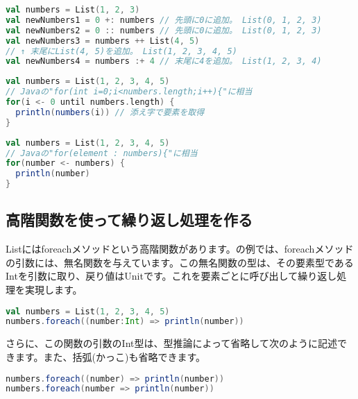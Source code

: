 \begin{lstlisting}[language=scala, label=src:add_elements, caption=要素を追加する例]
val numbers = List(1, 2, 3)
val newNumbers1 = 0 +: numbers // 先頭に0に追加。 List(0, 1, 2, 3)
val newNumbers2 = 0 :: numbers // 先頭に0に追加。 List(0, 1, 2, 3)
val newNumbers3 = numbers ++ List(4, 5)
// ↑ 末尾にList(4, 5)を追加。 List(1, 2, 3, 4, 5)
val newNumbers4 = numbers :+ 4 // 末尾に4を追加。 List(1, 2, 3, 4)
\end{lstlisting}

\begin{lstlisting}[language=scala, label=src:for_statement, caption=Listの各要素を表示する二通りの方法(Javaのfor文に相当する書き方)]
val numbers = List(1, 2, 3, 4, 5)
// Javaの"for(int i=0;i<numbers.length;i++){"に相当
for(i <- 0 until numbers.length) {
  println(numbers(i)) // 添え字で要素を取得
}
\end{lstlisting}

\begin{lstlisting}[language=scala, label=src:ex_for_statement, caption=Listの各要素を表示する二通りの方法(Javaの拡張for文に相当する書き方)]
val numbers = List(1, 2, 3, 4, 5)
// Javaの"for(element : numbers){"に相当
for(number <- numbers) {
  println(number)
}
\end{lstlisting}

\subsection{高階関数を使って繰り返し処理を作る}
Listにはforeachメソッドという高階関数があります。の例では、foreachメソッドの引数には、無名関数を与えています。この無名関数の型は、その要素型であるIntを引数に取り、戻り値はUnitです。これを要素ごとに呼び出して繰り返し処理を実現します。

\begin{lstlisting}[language=scala, label=src:list_foreach, caption=Listのforeachメソッドを使って要素を表示する]
val numbers = List(1, 2, 3, 4, 5)
numbers.foreach((number:Int) => println(number))
\end{lstlisting}

さらに、この関数の引数のInt型は、型推論によって省略して次のように記述できます。また、括弧(かっこ)も省略できます。

\begin{lstlisting}[language=scala, frame=none]
numbers.foreach((number) => println(number))
numbers.foreach(number => println(number))
\end{lstlisting}

